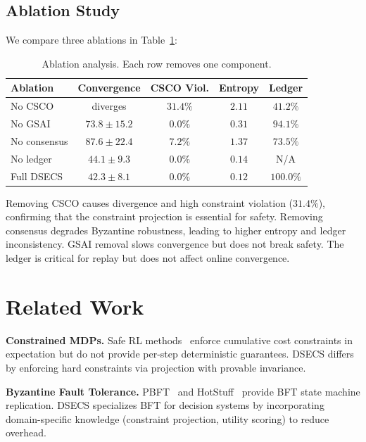 \documentclass[11pt,letterpaper]{article}
\begin{document}
\subsection{Ablation Study}

We compare three ablations in Table~\ref{tab:ablation}:

\begin{table}[t]
    \centering
    \caption{Ablation analysis. Each row removes one component.}
    \label{tab:ablation}
    \begin{tabular}{lcccc}
        \toprule
        Ablation & Convergence & CSCO Viol. & Entropy & Ledger \\
        \midrule
        No CSCO & diverges & $31.4\%$ & $2.11$ & $41.2\%$ \\
        No GSAI & $73.8 \pm 15.2$ & $0.0\%$ & $0.31$ & $94.1\%$ \\
        No consensus & $87.6 \pm 22.4$ & $7.2\%$ & $1.37$ & $73.5\%$ \\
        No ledger & $44.1 \pm 9.3$ & $0.0\%$ & $0.14$ & N/A \\
        Full DSECS & $42.3 \pm 8.1$ & $0.0\%$ & $0.12$ & $100.0\%$ \\
        \bottomrule
    \end{tabular}
\end{table}

Removing CSCO causes divergence and high constraint violation ($31.4\%$),
confirming that the constraint projection is essential for safety.
Removing consensus degrades Byzantine robustness, leading to higher
entropy and ledger inconsistency. GSAI removal slows convergence but
does not break safety. The ledger is critical for replay but does not
affect online convergence.

\section{Related Work}

\textbf{Constrained MDPs.}
Safe RL methods~\cite{achiam2017constrained,altman1999constrained}
enforce cumulative cost constraints in expectation but do not provide
per-step deterministic guarantees. DSECS differs by enforcing hard
constraints via projection with provable invariance.

\textbf{Byzantine Fault Tolerance.}
PBFT~\cite{castro1999practical} and HotStuff~\cite{yin2019hotstuff}
provide BFT state machine replication. DSECS specializes BFT for
decision systems by incorporating domain-specific knowledge (constraint
projection, utility scoring) to reduce overhead.
\end{document}
